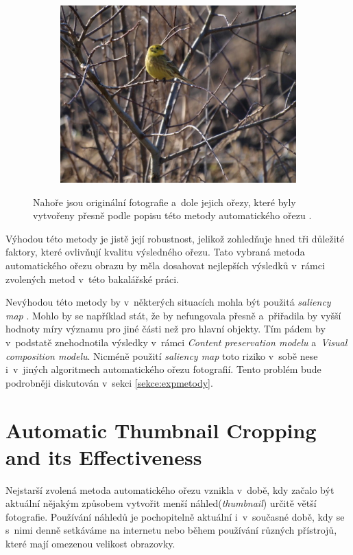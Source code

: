 \begin{figure}[H]
\begin{subfigure}{.32\textwidth}
      \includegraphics[scale=1.0]{obrazky/cropFangstrnad.jpg}
    \end{subfigure}
    \vspace{1pt}
\caption{Nahoře jsou originální fotografie a~dole jejich ořezy, které byly vytvořeny přesně podle popisu této metody automatického ořezu \cite{Fang2014}.}
\label{obr:allModelsCrop}
\end{figure}

Výhodou této metody je jistě její robustnost, jelikož zohledňuje hned tři důležité faktory, které ovlivňují kvalitu výsledného ořezu. Tato vybraná metoda automatického ořezu obrazu \cite{Fang2014} by měla dosahovat nejlepších výsledků v~rámci zvolených metod v~této bakalářské práci.

Nevýhodou této metody by v~některých situacích mohla být použitá \emph{saliency map} \cite{Margolin2013}. Mohlo by se například stát, že by nefungovala přesně a~přiřadila by vyšší hodnoty míry významu pro jiné části než pro hlavní objekty. Tím pádem by v~podstatě znehodnotila výsledky v~rámci \emph{Content preservation modelu} a~\emph{Visual composition modelu}. Nicméně použití \emph{saliency map} toto riziko v~sobě nese i~v~jiných algoritmech automatického ořezu fotografií. Tento problém bude podrobněji diskutován v~sekci \ref{sekce:expmetody}.
\newpage


\section{Automatic Thumbnail Cropping and its Effectiveness}\label{sekce:metoda3}
Nejstarší zvolená metoda automatického ořezu \cite{Suh2003} vznikla v~době, kdy začalo být aktuální nějakým způsobem vytvořit menší náhled(\emph{thumbnail}) určitě větší fotografie. Používání náhledů je pochopitelně aktuální i~v~současné době, kdy se s~nimi denně setkáváme na internetu nebo během používání různých přístrojů, které mají omezenou velikost obrazovky. 

